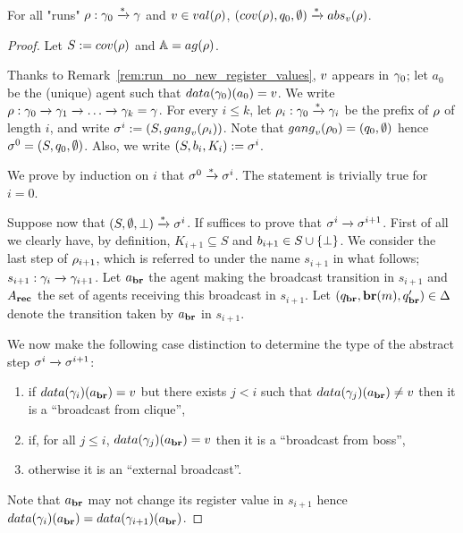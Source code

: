 \begin{lemma}
	\label{lem:proof_completeness_covset_constant}
	For all "runs" $\rho: \gamma_0 \xrightarrow{*} \gamma$ and $\aval \in \valsof{\run}$, $(\statesin{\run}, q_0, \emptyset) \step{*} \absproj{\aval}{\run}$. 
\end{lemma}

\ifproofs
\begin{proof}
	Let $\covset := \statesin{\run}$ and $\agents = \agentsof{\run}$.
	
	Thanks to Remark~\ref{rem:run_no_new_register_values},  $v$ appears in $\gamma_0$; let $a_0$ be the (unique) agent such that $\data{\config_0}(a_0) = \aval$. We write $\rho : \gamma_0 \xrightarrow{} \gamma_1 \xrightarrow{} \dots \xrightarrow{} \gamma_k = \gamma$. For every $i \leq k$, let $\rho_i : \gamma_0 \xrightarrow{*} \gamma_i$ be the prefix of $\rho$ of length $i$, and write $\aconfig^i := (\covset, \gangof{\aval}{\run_i})$. Note that $\gangof{\aval}{\run_0} = (q_0, \emptyset)$ hence $\sigma^0 = (S, q_0, \emptyset)$. Also, we write $(\covset, \boss_i, \clique_i) := \aconfig^i$.
	
	We prove by induction on $i$ that $\sigma^0 \xrightarrow{*} \sigma^i$.
	The statement is trivially true for $i =0$. 
	
	Suppose now that $(S, \emptyset, \bot) \xrightarrow{*} \sigma^i$. 
	If suffices to prove that $\sigma^i \xrightarrow{} \sigma^{i+1}$. First of all we clearly have, by definition, $K_{i+1} \subseteq S$ and $\boss_{i+1}\in S\cup\set{\noboss}$. We consider the last step of $\rho_{i+1}$, which is referred to under the name $s_{i+1}$ in what follows; $s_{i+1}: \gamma_i \xrightarrow{} \gamma_{i+1}$. Let $a_{\textbf{br}}$ the agent making the broadcast transition in $s_{i+1}$ and $A_{\textbf{rec}}$ the set of agents receiving this broadcast in $s_{i+1}$. Let $(q_{\textbf{br}}, \textbf{br}(m), q_{\textbf{br}}') \in \Delta$ denote the transition taken by $a_{\textbf{br}}$ in $s_{i+1}$.
	
	We now make the following case distinction to determine the type of the abstract step $\sigma^i \xrightarrow{} \sigma^{i+1}$:
	\begin{enumerate}
		\item\label{proof_completeness:case_broadcast_clique} if $\data{\config_{i}}(\agentbr) = \aval$ but there exists $j<i$ such that $\data{\config_{j}}(\agentbr) \ne \aval$ then it is a ``broadcast from clique'',
		\item\label{proof_completeness:case_broadcast_boss} if, for all $j \leq i$, $\data{\config_j}(\agentbr) = \aval$ then it is a ``broadcast from boss'',
		\item\label{proof_completeness:case_external_broadcast} otherwise it is an ``external broadcast''. 
	\end{enumerate}
	Note that $a_{\textbf{br}}$ may not change its register value in $s_{i+1}$ hence $\data{\config_i}(\agentbr) = \data{\config_{i+1}}(\agentbr)$. 
	

\end{proof}

